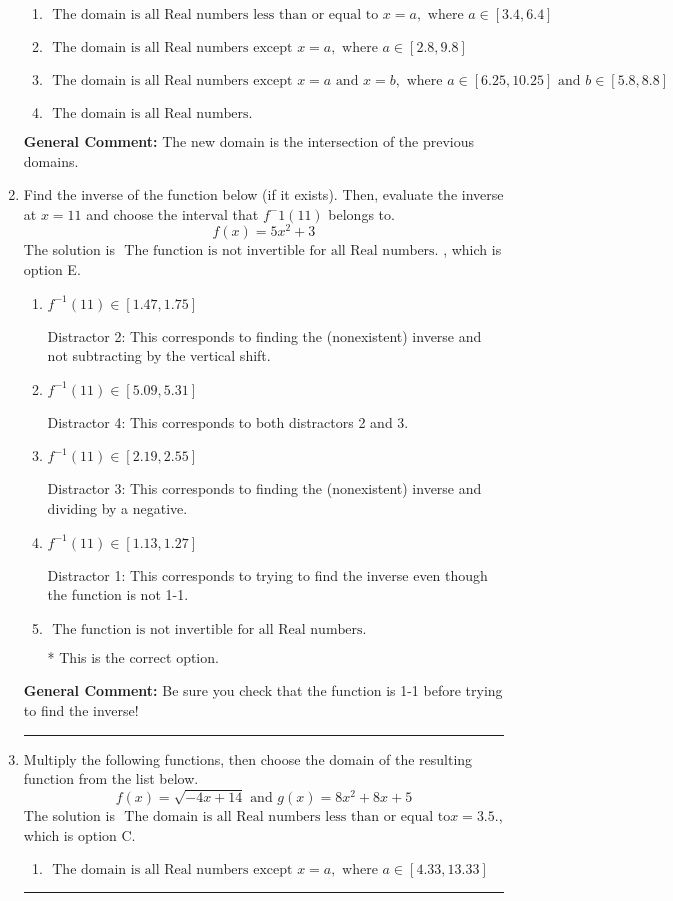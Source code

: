 \documentclass{extbook}[14pt]
\newcommand{\litem}[1]{\item #1

\rule{\textwidth}{0.4pt}}
\begin{document}
\begin{enumerate}
{\begin{enumerate}[label=\Alph*.]
\item \( \text{ The domain is all Real numbers less than or equal to } x = a, \text{ where } a \in [3.4, 6.4] \)


\item \( \text{ The domain is all Real numbers except } x = a, \text{ where } a \in [2.8, 9.8] \)


\item \( \text{ The domain is all Real numbers except } x = a \text{ and } x = b, \text{ where } a \in [6.25, 10.25] \text{ and } b \in [5.8, 8.8] \)


\item \( \text{ The domain is all Real numbers. } \)


\end{enumerate}

\textbf{General Comment:} The new domain is the intersection of the previous domains.
}
\litem{
Find the inverse of the function below (if it exists). Then, evaluate the inverse at $x = 11$ and choose the interval that $f^-1(11)$ belongs to.
\[ f(x) = 5 x^2 + 3 \]The solution is \( \text{ The function is not invertible for all Real numbers. } \), which is option E.\begin{enumerate}[label=\Alph*.]
\item \( f^{-1}(11) \in [1.47, 1.75] \)

 Distractor 2: This corresponds to finding the (nonexistent) inverse and not subtracting by the vertical shift.
\item \( f^{-1}(11) \in [5.09, 5.31] \)

 Distractor 4: This corresponds to both distractors 2 and 3.
\item \( f^{-1}(11) \in [2.19, 2.55] \)

 Distractor 3: This corresponds to finding the (nonexistent) inverse and dividing by a negative.
\item \( f^{-1}(11) \in [1.13, 1.27] \)

 Distractor 1: This corresponds to trying to find the inverse even though the function is not 1-1. 
\item \( \text{ The function is not invertible for all Real numbers. } \)

* This is the correct option.
\end{enumerate}

\textbf{General Comment:} Be sure you check that the function is 1-1 before trying to find the inverse!
}
\litem{
Multiply the following functions, then choose the domain of the resulting function from the list below.
\[ f(x) = \sqrt{-4x+14}  \text{ and } g(x) = 8x^{2} +8 x + 5 \]The solution is \( \text{ The domain is all Real numbers less than or equal to} x = 3.5. \), which is option C.\begin{enumerate}[label=\Alph*.]
\item \( \text{ The domain is all Real numbers except } x = a, \text{ where } a \in [4.33, 13.33] \)



\end{enumerate}}
\end{enumerate}
\end{document}
